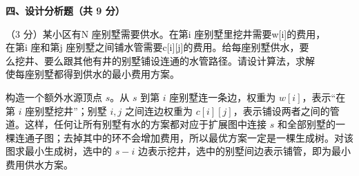 \textbf{四、设计分析题（共 9 分）}
\begin{question}
（3 分）某小区有N 座别墅需要供水。在第i 座别墅里挖井需要w[i]的费用，\\
在第i 座和第j 座别墅之间铺水管需要c[i][j]的费用。给每座别墅供水，要\\
么挖井、要么跟其他有井的别墅铺设连通的水管路径。请设计算法，求解\\
使每座别墅都得到供水的最小费用方案。\\
\begin{solution}
构造一个额外水源顶点 $s$。从 $s$ 到第 $i$ 座别墅连一条边，权重为 $w[i]$，表示“在第 $i$ 座别墅挖井”；别墅 $i,j$ 之间连边权重为 $c[i][j]$，表示铺设两者之间的管道。这样，任何让所有别墅有水的方案都对应于扩展图中连接 $s$ 和全部别墅的一棵连通子图；去掉其中的环不会增加费用，所以最优方案一定是一棵生成树。对该图求最小生成树，选中的 $s-i$ 边表示挖井，选中的别墅间边表示铺管，即为最小费用供水方案。
\end{solution}
\end{question}

